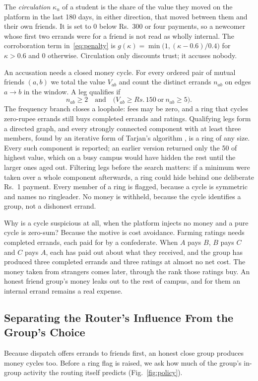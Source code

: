 \documentclass[journal]{IEEEtran}
\newcommand{\Rs}{Rs.\,}
\begin{document}
The \emph{circulation} $\kappa_u$ of a student is the share of the value they moved
on the platform in the last 180 days, in either direction, that moved between them
and their own friends. It is set to 0 below Rs.~300 or four payments, so a newcomer
whose first two errands were for a friend is not read as wholly internal. The
corroboration term in~\eqref{eq:penalty} is $g(\kappa)=\min\bigl(1,(\kappa-0.6)/0.4\bigr)$
for $\kappa>0.6$ and 0 otherwise. Circulation only discounts trust; it accuses nobody.

An accusation needs a closed money cycle. For every ordered pair of mutual friends
$(a,b)$ we total the value $V_{ab}$ and count the distinct errands $n_{ab}$ on edges
$a\to b$ in the window. A leg qualifies if
\begin{equation}
n_{ab}\ge2 \quad\text{and}\quad \bigl(V_{ab}\ge\Rs150 \ \text{or}\ n_{ab}\ge5\bigr).
\end{equation}
The frequency branch closes a loophole: fees may be zero, and a ring that cycles
zero-rupee errands still buys completed errands and ratings. Qualifying legs form a
directed graph, and every strongly connected component with at least three members,
found by an iterative form of Tarjan's algorithm \cite{tarjan1972depth}, is a ring
of any size. Every such component is reported; an earlier version returned only the
50 of highest value, which on a busy campus would have hidden the rest until the
larger ones aged out. Filtering legs before the search matters: if a minimum were
taken over a whole component afterwards, a ring could hide behind one deliberate
Rs.~1 payment.
Every member of a ring is flagged, because a cycle is symmetric and names no
ringleader. No money is withheld, because the cycle identifies a group, not a
dishonest errand.

Why is a cycle suspicious at all, when the platform injects no money and a pure
cycle is zero-sum? Because the motive is cost avoidance. Farming ratings needs
completed errands, each paid for by a confederate. When $A$ pays $B$, $B$ pays $C$
and $C$ pays $A$, each has paid out about what they received, and the group has
produced three completed errands and three ratings at almost no net cost. The money
taken from strangers comes later, through the rank those ratings buy. An honest
friend group's money leaks out to the rest of campus, and for them an internal errand
remains a real expense.

\subsection{Separating the Router's Influence From the Group's Choice}\label{sec:design-policy}
Because dispatch offers errands to friends first, an honest close group produces
money cycles too. Before a ring flag is raised, we ask how much of the group's
in-group activity the routing itself predicts (Fig.~\ref{fig:policy}).
\end{document}
